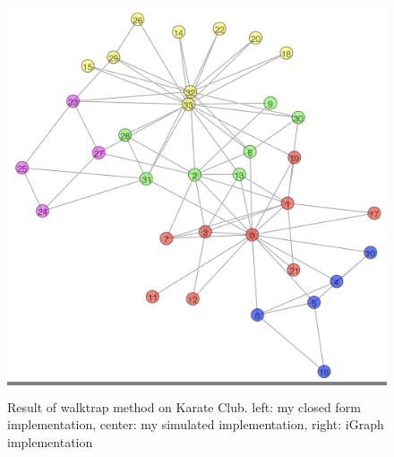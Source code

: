 \documentclass{article}
\begin{document}
\begin{figure}[h]
\begin{minipage}{0.3\textwidth}
    \end{minipage}
    \hspace{\fill}
    \begin{minipage}{0.3\textwidth}
    \colorbox{gray}{\includegraphics[width=\linewidth]{./images/walktrap-i.png}}
    \end{minipage}

    \caption{Result of walktrap method on Karate Club. left: my closed form implementation, center: my simulated implementation, right: iGraph implementation}
    \label{walktrap}
\end{figure}
\end{document}
